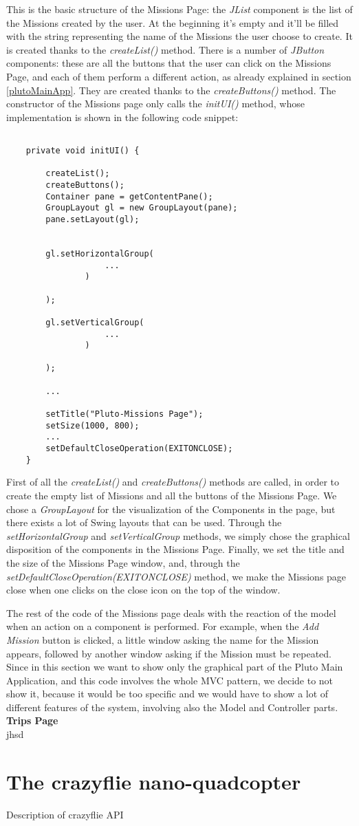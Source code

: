 This is the basic structure of the Missions Page:
the \textit{JList} component is the list of the Missions created by the user. At the beginning it's empty and it'll be filled with the string representing the name of the Missions the user choose to create.
It is created thanks to the \textit{createList()} method.
There is a number of \textit{JButton} components:
these are all the buttons that the user can click on the Missions Page, and each of them perform a different action, as already explained in section \ref{plutoMainApp}.
They are created thanks to the \textit{createButtons()} method.
The constructor of the Missions page only calls the \textit{initUI()} method, whose implementation is shown in the following code snippet:

\begin{lstlisting}

	private void initUI() {

		createList();
		createButtons();
		Container pane = getContentPane();
		GroupLayout gl = new GroupLayout(pane);
		pane.setLayout(gl);


		gl.setHorizontalGroup(
        			...
				)
                
        );

		gl.setVerticalGroup(
					...
				)

		);

		...

		setTitle("Pluto-Missions Page");
		setSize(1000, 800);
        ...
		setDefaultCloseOperation(EXITONCLOSE);
	}
\end{lstlisting}
First of all the \textit{createList()} and \textit{createButtons()} methods are called, in order to create the empty list of Missions and all the buttons of the Missions Page.
We chose a \textit{GroupLayout} for the visualization of the Components in the page, but there exists a lot of Swing layouts that can be used.
Through the \textit{setHorizontalGroup} and \textit{setVerticalGroup} methods, we simply chose the graphical disposition of the components in the Missions Page.
Finally, we set the title and the size of the Missions Page window, and, through the \textit{setDefaultCloseOperation(EXITONCLOSE)} method, we make the Missions page close when one clicks on the close icon on the top of the window.

The rest of the code of the Missions page deals with the reaction of the model when an action on a component is performed.
For example, when the \textit{Add Mission} button is clicked, a little window asking the name for the Mission appears, followed by another window asking if the Mission must be repeated.
Since in this section we want to show only the graphical part of the Pluto Main Application, and this code involves the whole MVC pattern, we decide to not show it, because it would be too specific and we would have to show a lot of different features of the system, involving also the Model and Controller parts.
\\

\textbf{Trips Page}
\\

jhsd

\section{The crazyflie nano-quadcopter}\label{crazyflie}

Description of crazyflie API 
